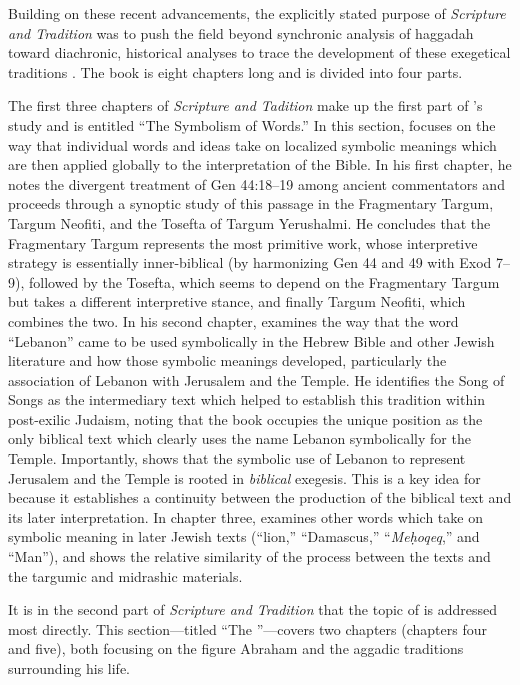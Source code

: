 Building on these recent advancements, the explicitly stated purpose of \emph{Scripture and Tradition} was to push the field beyond synchronic analysis of haggadah toward diachronic, historical analyses to trace the development of these exegetical traditions \autocites[1]{vermes1961}[See also][]{bloch1955_repr}. The book is eight chapters long and is divided into four parts. 

The first three chapters of \emph{Scripture and Tadition} make up the first part of \vermes's study and is entitled ``The Symbolism of Words.'' In this section, \vermes focuses on the way that individual words and ideas take on localized symbolic meanings which are then applied globally to the interpretation of the Bible. In his first chapter, he notes the divergent treatment of Gen 44:18--19 among ancient commentators and proceeds through a synoptic study of this passage in the Fragmentary Targum, Targum Neofiti, and the Tosefta of Targum Yerushalmi. He concludes that the Fragmentary Targum represents the most primitive work, whose interpretive strategy is essentially inner-biblical (by harmonizing Gen 44 and 49 with Exod 7--9), followed by the Tosefta, which seems to depend on the Fragmentary Targum but takes a different interpretive stance, and finally Targum Neofiti, which combines the two. In his second chapter, \vermes examines the way that the word ``Lebanon'' came to be used symbolically in the Hebrew Bible and other Jewish literature and how those symbolic meanings developed, particularly the association of Lebanon with Jerusalem and the Temple. He identifies the Song of Songs as the intermediary text which helped to establish this tradition within post-exilic Judaism, noting that the book occupies the unique position as the only biblical text which clearly uses the name Lebanon symbolically for the Temple. Importantly, \vermes shows that the symbolic use of Lebanon to represent Jerusalem and the Temple is rooted in \emph{biblical} exegesis. This is a key idea for \vermes because it establishes a continuity between the production of the biblical text and its later interpretation. In chapter three, \vermes examines other words which take on symbolic meaning in later Jewish texts (``lion,'' ``Damascus,'' ``\emph{Meḥoqeq},'' and ``Man''), and shows the relative similarity of the process between the \dss texts and the targumic and midrashic materials. 

It is in the second part of \emph{Scripture and Tradition} that the topic of \RwB is addressed most directly. This section---titled ``The \RwB''---covers two chapters (chapters four and five), both focusing on the figure Abraham and the aggadic traditions surrounding his life. 

